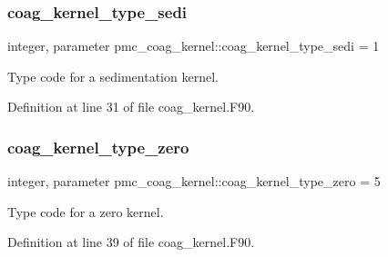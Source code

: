 \subsubsection{\texorpdfstring{coag\+\_\+kernel\+\_\+type\+\_\+sedi}{coag\_kernel\_type\_sedi}}
{\footnotesize\ttfamily integer, parameter pmc\+\_\+coag\+\_\+kernel\+::coag\+\_\+kernel\+\_\+type\+\_\+sedi = 1}



Type code for a sedimentation kernel. 



Definition at line 31 of file coag\+\_\+kernel.\+F90.

\mbox{\label{namespacepmc__coag__kernel_a6d75eae86113c1790f98fe66147bcdcc}} 
\subsubsection{\texorpdfstring{coag\+\_\+kernel\+\_\+type\+\_\+zero}{coag\_kernel\_type\_zero}}
{\footnotesize\ttfamily integer, parameter pmc\+\_\+coag\+\_\+kernel\+::coag\+\_\+kernel\+\_\+type\+\_\+zero = 5}



Type code for a zero kernel. 



Definition at line 39 of file coag\+\_\+kernel.\+F90.

